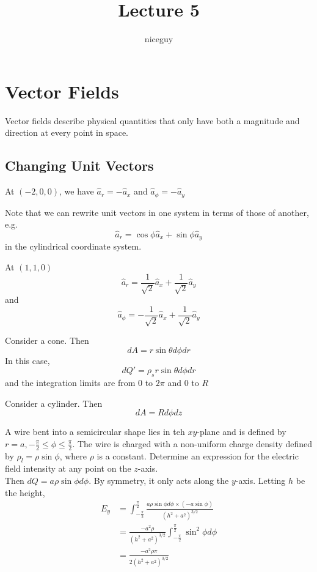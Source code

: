 \documentclass[12pt]{article}
\author{niceguy}
\title{Lecture 5}
\begin{document}
\maketitle

\section{Vector Fields}

Vector fields describe physical quantities that only have both a magnitude and direction at every point in space.

\subsection{Changing Unit Vectors}

\begin{ex}
	At $(-2,0,0)$, we have $\hat{a}_r = -\hat{a}_x$ and $\hat{a}_\phi = -\hat{a}_y$
\end{ex}

Note that we can rewrite unit vectors in one system in terms of those of another, e.g.
$$\hat{a}_r = \cos\phi\hat{a}_x + \sin\phi\hat{a}_y$$
in the cylindrical coordinate system.

\begin{ex}
	At $(1,1,0)$
	$$\hat{a}_r = \frac{1}{\sqrt{2}}\hat{a}_x + \frac{1}{\sqrt{2}}\hat{a}_y$$
	and
	$$\hat{a}_\phi = -\frac{1}{\sqrt{2}}\hat{a}_x + \frac{1}{\sqrt{2}}\hat{a}_y$$
\end{ex}


\begin{ex}
	Consider a cone. Then
	$$dA = r\sin\theta d\phi dr$$
	In this case,
	$$dQ' = \rho_sr\sin\theta d\phi dr$$
	and the integration limits are from $0$ to $2\pi$ and $0$ to $R$
\end{ex}

\begin{ex}
	Consider a cylinder. Then
	$$dA = Rd\phi dz$$
\end{ex}

\begin{ex}
	A wire bent into a semicircular shape lies in teh $xy$-plane and is defined by $r=a,-\frac{\pi}{2}\leq\phi\leq\frac{\pi}{2}$. The wire is charged with a non-uniform charge density defined by $\rho_l = \rho\sin\phi$, where $\rho$ is a constant. Determine an expression for the electric field intensity at any point on the $z$-axis. \\
	Then $dQ = a\rho\sin\phi d\phi$. By symmetry, it only acts along the $y$-axis. Letting $h$ be the height,
	\begin{align*}
		E_y &= \int_{-\frac{\pi}{2}}^{\frac{\pi}{2}} \frac{a\rho\sin\phi d\phi \times (-a\sin\phi)}{(h^2+a^2)^{3/2}} \\
		    &= \frac{-a^2\rho}{(h^2+a^2)^{3/2}} \int_{-\frac{\pi}{2}}^{\frac{\pi}{2}} \sin^2\phi d\phi \\
		    &= \frac{-a^2\rho\pi}{2(h^2+a^2)^{3/2}}
	\end{align*}
\end{ex}
\end{document}
